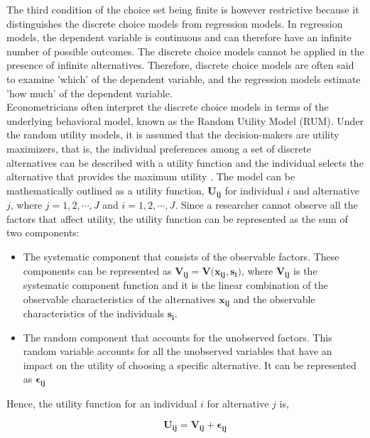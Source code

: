 \documentclass[a4paper,11pt]{article}
\begin{document}
    The third condition of the choice set being finite is however restrictive because it distinguishes the discrete choice models from regression models. In regression models, the dependent variable is continuous and can therefore have an infinite number of possible outcomes. The discrete choice models cannot be applied in the presence of infinite alternatives. Therefore, discrete choice models are often said to examine 'which' of the dependent variable, and the regression models estimate 'how much' of the dependent variable.\\

    Econometricians often interpret the discrete choice models in terms of the underlying behavioral model, known as the Random Utility Model (RUM). Under the random utility models, it is assumed that the decision-makers are utility maximizers, that is, the individual preferences among a set of discrete alternatives can be described with a utility function and the individual selects the alternative that provides the maximum utility \cite{Horowitz1991}. The model can be mathematically outlined as a utility function, $\mathbf{U_{ij}}$  for individual $i$ and alternative $j$, where $j = 1, 2,\cdots, J$ and $i = 1, 2, \cdots, J$. Since a researcher cannot observe all the factors that affect utility, the utility function can be represented as the sum of two components: 
    
    \begin{itemize}
        \item The systematic component that consists of the observable factors. These components can be represented as $\mathbf{V_{ij} = V(x_{ij},s_{i}})$, where $\mathbf{V_{ij}}$ is the systematic component function and it is the linear combination of the observable characteristics of the alternatives $\mathbf{x_{ij}}$ and the observable characteristics of the individuals $\mathbf{s_{i}}$.
        \item The random component that accounts for the unobserved factors. This random variable accounts for all the unobserved variables that have an impact on the utility of choosing a specific alternative. It can be represented as $\mathbf{\epsilon_{ij}}$
    \end{itemize}
    
     Hence, the utility function for an individual $i$ for alternative $j$ is, 
    
    \begin{equation*}
        \qquad \mathbf{U_{ij}} = \mathbf{V_{ij}} + \mathbf{\epsilon_{ij}}    
    \end{equation*}
\end{document}

